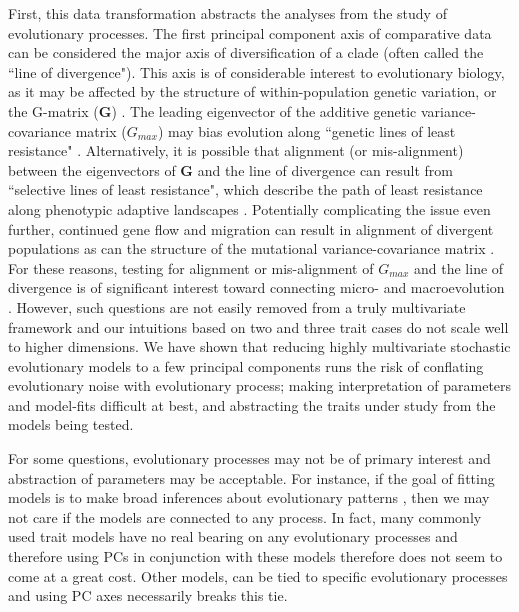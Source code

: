 \documentclass[a4paper,12pt]{article}
\begin{document}
First, this data transformation abstracts the analyses from the study of evolutionary processes. The first principal component axis of comparative data can be considered the major axis of diversification of a clade (often called the ``line of divergence"). This axis is of considerable interest to evolutionary biology, as it may be affected by the structure of within-population genetic variation, or the G-matrix ($\mathbf{G}$) \citep{Schluter1996}. The leading eigenvector of the additive genetic variance-covariance matrix ($G_{max}$) may bias evolution along ``genetic lines of least resistance" \citep{Schluter1996, Arnoldetal2001}. Alternatively, it is possible that alignment (or mis-alignment) between the eigenvectors of $\mathbf{G}$ and the line of divergence can result from ``selective lines of least resistance", which describe the path of least resistance along phenotypic adaptive landscapes \citep{Arnold2003, Jonesetal2007, Arnoldetal2008}. Potentially complicating the issue even further, continued gene flow and migration can result in alignment of divergent populations \citep{Guillaume2007} as can the structure of the mutational variance-covariance matrix \citep{Jonesetal2007, Hether2013}. For these reasons, testing for alignment or mis-alignment of $G_{max}$ and the line of divergence is of significant interest toward connecting micro- and macroevolution \citep{Hohenlohe2008}. However, such questions are not easily removed from a truly multivariate framework and our intuitions based on two and three trait cases do not scale well to higher dimensions. We have shown that reducing highly multivariate stochastic evolutionary models to a few principal components runs the risk of conflating evolutionary noise with evolutionary process; making interpretation of parameters and model-fits difficult at best, and abstracting the traits under study from the models being tested. 

For some questions, evolutionary processes may not be of primary interest and abstraction of parameters may be acceptable. For instance, if the goal of fitting models is to make broad inferences about evolutionary patterns \citep{Freckleton2011, Hunt2012}, then we may not care if the models are connected to any process. In fact, many commonly used trait models \citep[notably, the ``Pagel'' tree transformations $\lambda, \delta, \kappa$][]{Pagel1997, Pagel1999} have no real bearing on any evolutionary processes \citep{HansenOrzack2005} and therefore using PCs in conjunction with these models therefore does not seem to come at a great cost. Other models, can be tied to specific evolutionary processes \citep{HansenMartins1996, EstesArnold2007, Hansen2008, Hansen2012SysBio, PennellHarmon, PennellPE} and using PC axes necessarily breaks this tie.
\end{document}
